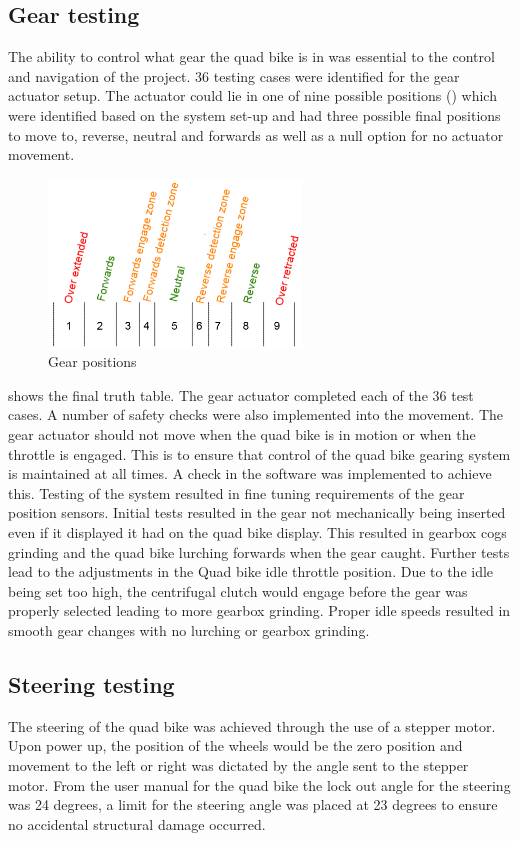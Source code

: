 \documentclass[main.tex]{subfiles}
\begin{document}
\subsection{Gear testing}
The ability to control what gear the quad bike is in was essential to the control and navigation of the project. 36 testing cases were identified for the gear actuator setup. The actuator could lie in one of nine possible positions () which were identified based on the system set-up and had three possible final positions to move to, reverse, neutral and forwards as well as a null option for no actuator movement. 
\begin{figure}[ht]
\includegraphics[width=0.6\textwidth]{5-Testing/gearDiagram.png}
\centering
\caption[Gear positions]{Gear positions}
\end{figure}
 shows the final truth table. The gear actuator completed each of the 36 test cases. A number of safety checks were also implemented into the movement. The gear actuator should not move when the quad bike is in motion or when the throttle is engaged. This is to ensure that control of the quad bike gearing system is maintained at all times.  A check in the software was implemented to achieve this. Testing of the system resulted in fine tuning requirements of the gear position sensors. Initial tests resulted in the gear not mechanically being inserted even if it displayed it had on the quad bike display. This resulted in gearbox cogs grinding and the quad bike lurching forwards when the gear caught. Further tests lead to the adjustments in the Quad bike idle throttle position. Due to the idle being set too high, the centrifugal clutch would engage before the gear was properly selected leading to more gearbox grinding. Proper idle speeds resulted in smooth gear changes with no lurching or gearbox grinding.

\subsection{Steering testing}
The steering of the quad bike was achieved through the use of a stepper motor. Upon power up, the position of the wheels would be the zero position and movement to the left or right was dictated by the angle sent to the stepper motor. From the user manual for the quad bike the lock out angle for the steering was 24 degrees, a limit for the steering angle was placed at 23 degrees to ensure no accidental structural damage occurred.
\end{document}
